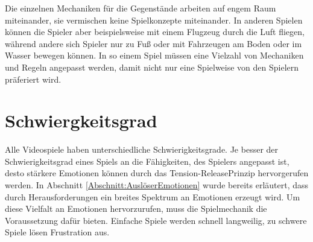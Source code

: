 Die einzelnen Mechaniken für die Gegenstände arbeiten auf engem Raum miteinander, sie vermischen keine Spielkonzepte miteinander. In anderen Spielen können die Spieler aber beispielsweise mit einem Flugzeug durch die Luft fliegen, während andere sich Spieler nur zu Fuß oder mit Fahrzeugen am Boden oder im Wasser bewegen können. In so einem Spiel müssen eine Vielzahl von Mechaniken und Regeln angepasst werden, damit nicht nur eine Spielweise von den Spielern präferiert wird.\cite[S. 55]{Adams:1515529}




\section{Schwiergkeitsgrad} 
\label{Abschnitt:Skill}

Alle Videospiele haben unterschiedliche Schwierigkeitsgrade. Je besser der Schwierigkeitsgrad eines Spiels an die Fähigkeiten, des Spielers angepasst ist, desto stärkere Emotionen können durch das \glqq Tension-Release\grqq\-Prinzip hervorgerufen werden. In Abschnitt \ref{Abschnitt:AuslöserEmotionen} wurde bereits erläutert, dass durch Herausforderungen ein breites Spektrum an Emotionen erzeugt wird. Um diese Vielfalt an Emotionen hervorzurufen, muss die Spielmechanik die Voraussetzung dafür bieten. Einfache Spiele werden schnell langweilig, zu schwere Spiele lösen Frustration aus. \cite[S. 63]{Adams:1515529}






